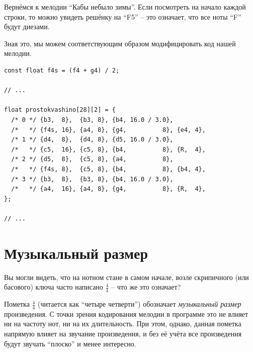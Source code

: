 \documentclass[a4paper,twoside]{book}
\begin{document}
Вернёмся к мелодии ``Кабы небыло зимы''.  Если посмотреть на начало каждой
строки, то можно увидеть решёнку на ``F5'' -- это означает, что все ноты ``F''
будут диезами.


Зная это, мы можем соответствующим образом модифицировать код нашей мелодии.

\begin{verbatim}
const float f4s = (f4 + g4) / 2;

// ...

float prostokvashino[28][2] = {
  /* 0 */ {b3,  8},  {b3, 8}, {b4, 16.0 / 3.0},
  /*   */ {f4s, 16}, {a4, 8}, {g4,          8}, {e4, 4},
  /* 1 */ {d4,  8},  {d4, 8}, {d5, 16.0 / 3.0},
  /*   */ {c5,  16}, {c5, 8}, {b4,          8}, {R,  4},
  /* 2 */ {d5,  8},  {c5, 8}, {a4,          8},
  /*   */ {f4s, 8},  {c5, 8}, {b4,          8}, {b4, 4},
  /* 3 */ {b3,  8},  {b3, 8}, {b4, 16.0 / 3.0},
  /*   */ {a4,  16}, {a4, 8}, {g4,          8}, {R,  4},
};

// ...
\end{verbatim}

\section{Музыкальный размер}

Вы могли видеть, что на нотном стане в самом начале, возле скрипичного (или
басового) ключа часто написано $\frac{4}{4}$ -- что же это означает?

Пометка $\frac{4}{4}$ (читается как ``четыре четверти'') обозначает
\emph{музыкальный размер} произведения.  С точки зрения кодирования мелодии в
программе это не влияет ни на частоту нот, ни на их длительность.  При этом,
однако, данная пометка напрямую влияет на звучание произведения, и без её учёта
все произведения будут звучать ``плоско'' и менее интересно.
\end{document}
